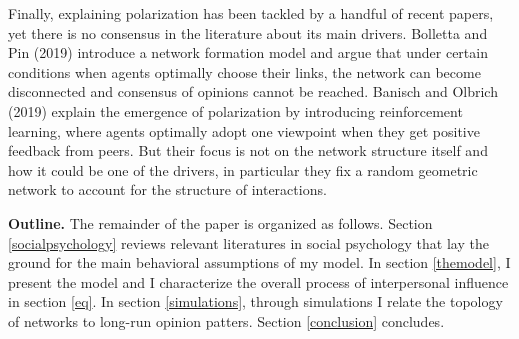 \documentclass{article}
\begin{document}

Finally, explaining polarization has been tackled by a handful of recent papers, yet there is no consensus in the literature about its main drivers. Bolletta and Pin (2019)\cite{bolletta} introduce a network formation model and argue that under certain conditions when agents optimally choose their links, the network can become disconnected and consensus of opinions cannot be reached. Banisch and Olbrich (2019)\cite{banisch_olbrich} explain the emergence of polarization by introducing reinforcement learning, where agents optimally adopt one viewpoint when they get positive feedback from peers. But their focus is not on the network structure itself and how it could be one of the drivers, in particular they fix a random geometric network to account for the structure of interactions. 
\bigskip

{\bf Outline.} The remainder of the paper is organized as follows. Section \ref{socialpsychology} reviews relevant literatures in social psychology that lay the ground for the main behavioral assumptions of my model. In section \ref{themodel}, I present the model and I characterize the overall process of interpersonal influence in section \ref{eq}. In section \ref{simulations}, through simulations I relate the topology of networks to long-run opinion patters. Section \ref{conclusion} concludes. 
\end{document}
